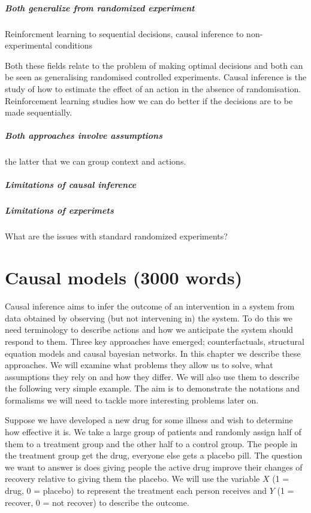\documentclass[11pt,a4paper,oneside]{book}
\begin{document}
\paragraph*{Both generalize from randomized experiment} Reinforcment learning to sequential decisions, causal inference to non-experimental conditions

Both these fields relate to the problem of making optimal decisions and both can be seen as generalising randomised controlled experiments. Causal inference  is the study of how to estimate the effect of an action in the absence of randomisation. Reinforcement learning studies how we can do better if the decisions are to be made sequentially. 

\paragraph*{Both approaches involve assumptions} the latter that we can group context and actions.

\paragraph*{Limitations of causal inference}

\paragraph*{Limitations of experimets} What are the issues with standard randomized experiments?

\chapter*{Causal models (3000 words)}

Causal inference aims to infer the outcome of an intervention in a system from data obtained by observing (but not intervening in) the system. To do this we need terminology to describe actions and how we anticipate the system should respond to them. Three key approaches have emerged; counterfactuals, structural equation models and causal bayesian networks. In this chapter we describe these approaches. We will examine what problems they allow us to solve, what assumptions they rely on and how they differ. We will also use them to describe the following very simple example. The aim is to demonstrate the notations and formalisms we will need to tackle more interesting problems later on.

Suppose we have developed a new drug for some illness and wish to determine how effective it is. We take a large group of patients and randomly assign half of them to a treatment group and the other half to a control group. The people in the treatment group get the drug, everyone else gets a placebo pill. The question we want to answer is does giving people the active drug improve their changes of recovery relative to giving them the placebo. We will use the variable $X$ (1 = drug, 0 = placebo) to represent the treatment each person receives and $Y$ (1 = recover, 0 = not recover) to describe the outcome. 
\end{document}
